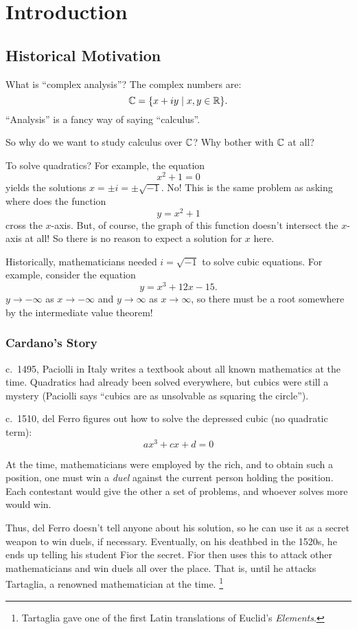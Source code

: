 \chapter{Introduction}
\section{Historical Motivation}
What is ``complex analysis''? The complex numbers are:
\[
  \mathbb{C} = \{x + iy \mid x, y \in \mathbb{R}\}
.\] 
``Analysis'' is a fancy way of saying ``calculus''.

So why do we want to study calculus over $\mathbb{C}$?
Why bother with $\mathbb{C}$ at all?

To solve quadratics? For example, the equation
\[x^2 + 1 = 0\]
yields the solutions $x = \pm i = \pm \sqrt{-1}$. No!
This is the same problem as asking where does the
function
\[y = x^2 + 1\]
cross the $x$-axis. But, of course, the graph of this
function doesn't intersect the $x$-axis at all! So there
is no reason to expect a solution for $x$ here.

Historically, mathematicians needed $i = \sqrt{-1}$
to solve cubic equations.
For example, consider the equation
\[y = x^3 + 12x - 15.\]
$y \to -\infty$ as $x \to -\infty$ and $y \to \infty$
as $x \to \infty$, so there must be a root somewhere by
the intermediate value theorem!

\subsection{Cardano's Story}
c.~1495, Paciolli in Italy writes a textbook about all
known mathematics at the time. Quadratics had already
been solved everywhere, but cubics were still a mystery
(Paciolli says ``cubics are as unsolvable as squaring
the circle'').

c.~1510, del Ferro figures out how to
solve the depressed cubic (no quadratic term):
\[ax^3 + cx + d = 0\]

At the time, mathematicians were employed by the rich,
and to obtain such a position, one must win a
\textit{duel} against the current person holding the
position. Each contestant would give the other a set
of problems, and whoever solves more would win.

Thus, del Ferro doesn't tell anyone about his solution,
so he can use it as a secret weapon to win duels, if
necessary. Eventually, on his deathbed in the
1520s, he ends up telling his student Fior the secret.
Fior then
uses this to attack other mathematicians and win duels
all over the place. That is, until he attacks Tartaglia,
a renowned mathematician at the time.
\footnote{Tartaglia gave one of the first Latin
translations of Euclid's \textit{Elements}.}

